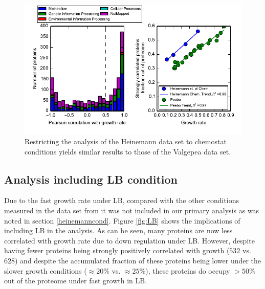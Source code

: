 \documentclass[a4paper]{article}
\newcommand{\hGlobal}{$628$}
\newcommand{\hGlobalLB}{$532$}
\begin{document}
\begin{figure}[H]
\begin{center}
\includegraphics[width=1\columnwidth]{Heinemann-chemosummaryHistAndGr.pdf}
\caption{\label{fig:growthcorrchemo}
  Restricting the analysis of the Heinemann data set to chemostat conditions yields similar results to those of the Valgepea data set.
%
}
\end{center}
\end{figure}

\subsection{Analysis including LB condition}
\label{lbanalysis}
Due to the fast growth rate under LB, compared with the other conditions measured in the data set from \cite{Heinemann2015} it was not included in our primary analysis as was noted in section \ref{heinemanncond}.
Figure \ref{fig:LB} shows the implications of including LB in the analysis.
As can be seen, many proteins are now less correlated with growth rate due to down regulation under LB.
However, despite having fewer proteins being strongly positively correlated with growth (\hGlobalLB{} vs. \hGlobal{}) and despite the accumulated fraction of these proteins being lower under the slower growth conditions ($\approx20\%$ vs. $\approx25\%$), these proteins do occupy $>50\%$ out of the proteome under fast growth in LB.
\end{document}

